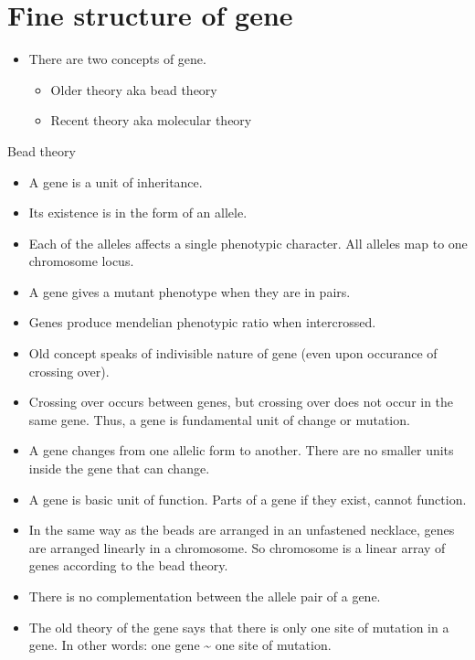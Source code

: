 \documentclass[11pt,dvipsnames,ignorenonframetext,aspectratio=169]{beamer}
\providecommand{\tightlist}{%
  \setlength{\itemsep}{0pt}\setlength{\parskip}{0pt}}
\begin{document}
\hypertarget{fine-structure-of-gene}{%
\section{Fine structure of gene}\label{fine-structure-of-gene}}

\begin{frame}{}
\protect\hypertarget{section-26}{}
\begin{itemize}
\tightlist
\item
  There are two concepts of gene.

  \begin{itemize}
  \tightlist
  \item
    Older theory aka bead theory
  \item
    Recent theory aka molecular theory
  \end{itemize}
\end{itemize}
\end{frame}

\begin{frame}{Bead theory}
\protect\hypertarget{bead-theory}{}
\begin{itemize}
\tightlist
\item
  A gene is a unit of inheritance.
\item
  Its existence is in the form of an allele.
\item
  Each of the alleles affects a single phenotypic character. All alleles
  map to one chromosome locus.
\item
  A gene gives a mutant phenotype when they are in pairs.
\item
  Genes produce mendelian phenotypic ratio when intercrossed.
\item
  Old concept speaks of indivisible nature of gene (even upon occurance
  of crossing over).
\item
  Crossing over occurs between genes, but crossing over does not occur
  in the same gene. Thus, a gene is fundamental unit of change or
  mutation.
\end{itemize}
\end{frame}

\begin{frame}{}
\protect\hypertarget{section-27}{}
\begin{itemize}
\tightlist
\item
  A gene changes from one allelic form to another. There are no smaller
  units inside the gene that can change.
\item
  A gene is basic unit of function. Parts of a gene if they exist,
  cannot function.
\item
  In the same way as the beads are arranged in an unfastened necklace,
  genes are arranged linearly in a chromosome. So chromosome is a linear
  array of genes according to the bead theory.
\item
  There is no complementation between the allele pair of a gene.
\item
  The old theory of the gene says that there is only one site of
  mutation in a gene. In other words: one gene \textasciitilde{} one
  site of mutation.
\end{itemize}
\end{frame}
\end{document}
